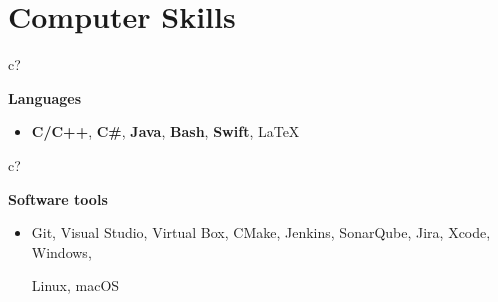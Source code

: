 \documentclass[12pt,a4paper,sans]{moderncv} %
\begin{document}
\begin{comment}
Rank yourself on proficiency in each. I broke mine down into "Advanced Knowledge", "Working Proficiency", and "Limited Exposure"
\end{comment}

\vspace{-4 mm}
\section{Computer Skills}


 \hspace{24.5 mm}
\begin{tabular}{c?}
 \\
\end{tabular}
 \hspace{2 mm}
 \textbf{Languages}
 
\begin{itemize}
\addtolength{\itemindent}{31.7 mm}
\item{\textbf{C/C++}, \textbf{C\#}, \textbf{Java}, \textbf{Bash}, \textbf{Swift}, \LaTeX}
\end{itemize}


 \hspace{24.5 mm}
\begin{tabular}{c?}
 \\
\end{tabular}
 \hspace{2 mm}
 \textbf{Software tools}
 
\begin{itemize}
\addtolength{\itemindent}{31.7 mm}
\item{Git, Visual Studio, Virtual Box, CMake, Jenkins, SonarQube, Jira, Xcode, Windows,

\hspace{30.5 mm}  Linux, macOS}

 \hspace{30.5 mm}
\end{itemize}



\end{document}
